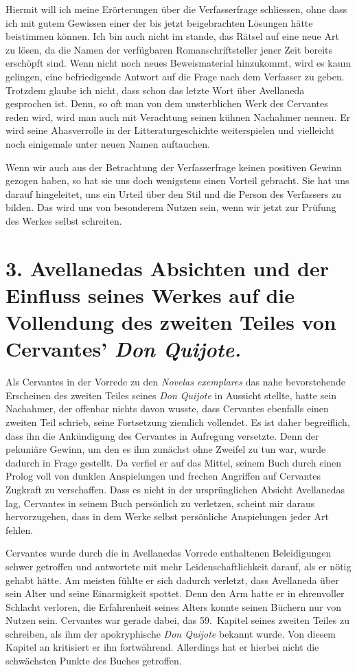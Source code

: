 Hiermit will ich meine Erörterungen über die Verfasserfrage schliessen,
ohne dass ich mit gutem Gewissen einer der bis jetzt beigebrachten
Lösungen hätte beistimmen können. Ich bin auch nicht im stande, das
Rätsel auf eine neue Art zu lösen, da die Namen der verfügbaren
Romanschriftsteller jener Zeit bereits erschöpft sind. Wenn nicht noch neues
Beweismaterial hinzukommt, wird es kaum gelingen, eine befriedigende
Antwort auf die Frage nach dem Verfasser zu geben. Trotzdem glaube
ich nicht, dass schon das letzte Wort über Avellaneda gesprochen ist.
Denn, so oft man von dem unsterblichen Werk des Cervantes reden
wird, wird man auch mit Verachtung seinen kühnen Nachahmer nennen.
Er wird seine Ahasverrolle in der Litteraturgeschichte weiterspielen und
vielleicht noch einigemale unter neuen Namen auftauchen.

Wenn wir auch aus der Betrachtung der Verfasserfrage keinen
positiven Gewinn gezogen haben, so hat sie uns doch wenigstens einen
Vorteil gebracht. Sie hat uns darauf hingeleitet, uns ein Urteil über
den Stil und die Person des Verfassers zu bilden. Das wird uns von
besonderem Nutzen sein, wenn wir jetzt zur Prüfung des Werkes selbst
schreiten.

\section{3. Avellanedas Absichten und der Einfluss seines
Werkes auf die Vollendung des zweiten Teiles
von Cervantes' {\it Don Quijote.}}

Als Cervantes in der Vorrede zu den {\it\spanish Novelas exemplares} das
nahe bevorstehende Erscheinen des zweiten Teiles seines {\it Don Quijote}
in Aussicht stellte, hatte sein Nachahmer, der offenbar nichts davon
wusste, dass Cervantes ebenfalls einen zweiten Teil schrieb, seine Fortsetzung
ziemlich vollendet. Es ist daher begreiflich, dass ihn die Ankündigung
des Cervantes in Aufregung versetzte. Denn der pekuniäre
Gewinn, um den es ihm zunächst ohne Zweifel zu tun war, wurde
dadurch in Frage gestellt. Da verfiel er auf das Mittel, seinem Buch
durch einen Prolog voll von dunklen Anspielungen und frechen Angriffen
auf Cervantes Zugkraft zu verschaffen. Dass es nicht in der
ursprünglichen Absicht Avellanedas lag, Cervantes in seinem Buch persönlich
zu verletzen, scheint mir daraus hervorzugehen, dass in dem
Werke selbst persönliche Anspielungen jeder Art fehlen.

Cervantes wurde durch die in Avellanedas Vorrede enthaltenen
Beleidigungen schwer getroffen und antwortete mit mehr Leidenschaftlichkeit
darauf, als er nötig gehabt hätte. Am meisten fühlte er sich
dadurch verletzt, dass Avellaneda über sein Alter und seine Einarmigkeit
spottet. Denn den Arm hatte er in ehrenvoller Schlacht verloren, die
Erfahrenheit seines Alters konnte seinen Büchern nur von Nutzen sein.
Cervantes war gerade dabei, das 59.~Kapitel seines zweiten Teiles zu
schreiben, als ihm der apokryphische {\it Don Quijote} bekannt wurde.
Von diesem Kapitel an kritisiert er ihn fortwährend. Allerdings hat er
hierbei nicht die schwächsten Punkte des Buches getroffen.

